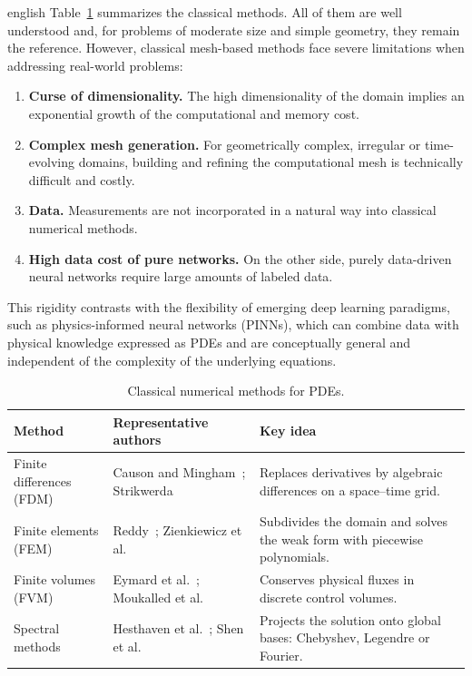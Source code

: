 \documentclass[../0000.tex]{subfiles}
\begin{document}
\begin{hyphenrules}{english}
Table~\ref{tab:classical-methods} summarizes the classical methods. All of them are well understood and,
for problems of moderate size and simple geometry, they remain the reference. However, classical
mesh-based methods face severe limitations when addressing real-world problems:
\begin{enumerate}
  \item \textbf{Curse of dimensionality.} The high dimensionality of the domain implies an exponential
    growth of the computational and memory cost.
  \item \textbf{Complex mesh generation.} For geometrically complex, irregular or time-evolving domains,
    building and refining the computational mesh is technically difficult and costly.
  \item \textbf{Data.} Measurements are not incorporated in a natural way into classical numerical
    methods.
  \item \textbf{High data cost of pure networks.} On the other side, purely data-driven neural
    networks require large amounts of labeled data.
\end{enumerate}
This rigidity contrasts with the flexibility of emerging deep learning paradigms, such as
physics-informed neural networks (PINNs), which can combine data with physical knowledge expressed as
PDEs and are conceptually general and independent of the complexity of the underlying equations.

\begin{table}[htbp]
  \centering
  \caption{Classical numerical methods for PDEs.}
  \label{tab:classical-methods}
  \small
  \begin{tabularx}{\linewidth}{@{}lXX@{}}
    \toprule
    Method & Representative authors & Key idea \\
    \midrule
    Finite differences (FDM) & Causon and Mingham~\cite{causon2010}; Strikwerda~\cite{strikwerda2004} &
      Replaces derivatives by algebraic differences on a space--time grid. \\
    Finite elements (FEM) & Reddy~\cite{reddy2019}; Zienkiewicz et al.~\cite{zienkiewicz2013} &
      Subdivides the domain and solves the weak form with piecewise polynomials. \\
    Finite volumes (FVM) & Eymard et al.~\cite{eymard2000}; Moukalled et al.~\cite{moukalled2016} &
      Conserves physical fluxes in discrete control volumes. \\
    Spectral methods & Hesthaven et al.~\cite{hesthaven2007}; Shen et al.~\cite{shen2011} &
      Projects the solution onto global bases: Chebyshev, Legendre or Fourier. \\
    \bottomrule
  \end{tabularx}
\end{table}


\end{hyphenrules}
\end{document}

